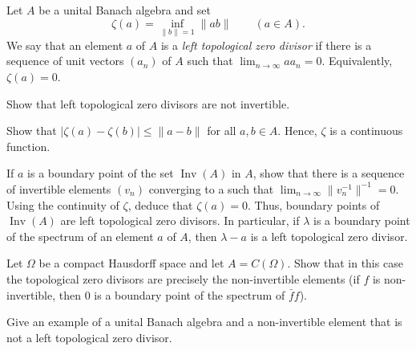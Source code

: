 \documentclass{../../small}
\newcommand{\Inv}{\operatorname{Inv}}
\begin{document}
\begin{prb}
Let $A$ be a unital Banach algebra and set
\[\zeta(a)=\inf_{\|b\|=1}\|ab\|\qquad(a\in A).\]
We say that an element $a$ of $A$ is a \emph{left topological zero divisor} if there is a sequence of unit vectors $(a_n)$ of $A$ such that $\lim_{n\to\infty}aa_n=0$.
Equivalently, $\zeta(a)=0$.
\begin{parts}
\item
Show that left topological zero divisors are not invertible.
\item
Show that $|\zeta(a)-\zeta(b)|\le\|a-b\|$ for all $a,b\in A$.
Hence, $\zeta$ is a continuous function.
\item
If $a$ is a boundary point of the set $\Inv(A)$ in $A$, show that there is a sequence of invertible elements $(v_n)$ converging to a such that $\lim_{n\to\infty}\|v_n^{-1}\|^{-1}=0$.
Using the continuity of $\zeta$, deduce that $\zeta(a)=0$.
Thus, boundary points of $\Inv(A)$ are left topological zero divisors.
In particular, if $\lambda$ is a boundary point of the spectrum of an element $a$ of $A$, then $\lambda-a$ is a left topological zero divisor.
\item
Let $\Omega$ be a compact Hausdorff space and let $A=C(\Omega)$.
Show that in this case the topological zero divisors are precisely the non-invertible elements (if $f$ is non-invertible, then 0 is a boundary point of the spectrum of $\bar ff$).
\item
Give an example of a unital Banach algebra and a non-invertible element that is not a left topological zero divisor.
\end{parts}
\end{prb}
\end{document}
